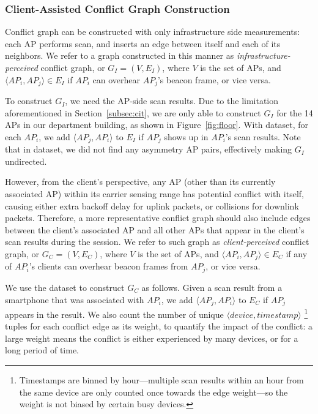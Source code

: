 \subsubsection{Client-Assisted Conflict Graph Construction}
\label{subsec:client_conflict}

Conflict graph can be constructed with only infrastructure side measurements:
each AP performs \wifi{} scan, and inserts an edge between itself and
each of its neighbors. We refer to a graph constructed in this manner as
\textit{infrastructure-perceived} conflict graph, or $G_I=(V, E_I)$, where $V$
is the set of APs, and $\langle AP_i, AP_j \rangle \in E_I$ if $AP_i$ can
overhear $AP_j$'s beacon frame, or vice versa. 

To construct $G_I$, we need the AP-side scan results. Due to the limitation
aforementioned in Section~\ref{subsec:cit}, we are only able to construct $G_I$
for the 14 APs in our department building, as shown in Figure~\ref{fig:floor}.
With \ubapdetail{} dataset, for each $AP_i$, we add $\langle AP_j, AP_i \rangle$
to $E_I$ if $AP_j$ shows up in $AP_i$'s scan results. Note that in \ubapdetail{}
dataset, we did not find any asymmetry AP pairs, effectively making $G_I$ undirected.

However, from the \wifi{} client's perspective, any AP (other than its currently
associated AP) within its carrier sensing range has potential conflict with
itself, causing either extra backoff delay for uplink packets, or collisions for
downlink packets. Therefore, a more representative conflict graph should also
include edges between the client's associated AP and all other APs that appear
in the client's scan results during the \wifi{} session. We refer to such graph as
\textit{client-perceived} conflict graph, or $G_C=(V, E_C)$, where $V$ is the
set of APs, and $\langle AP_i, AP_j \rangle \in E_C$ if any of $AP_i$'s clients
can overhear beacon frames from $AP_j$, or vice versa.

We use the \ubscan{} dataset to construct $G_C$ as follows. Given a scan
result from a smartphone that was associated with $AP_i$, we add $\langle AP_j,
AP_i \rangle$ to $E_C$ if $AP_j$ appears in the result. We also count the number
of unique $\langle device, timestamp \rangle$%
\footnote{Timestamps are binned by hour---multiple scan results within an hour
from the same device are only counted once towards the edge weight---so the
weight is not  biased by certain busy devices.} %
tuples for each conflict edge as its weight, to quantify the impact of
the conflict: a large weight means the conflict is either experienced by many
devices, or for a long period of time.


